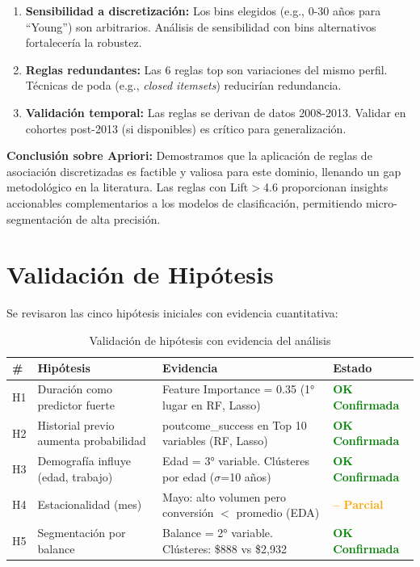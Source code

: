 \documentclass[12pt,letterpaper]{article}
\begin{document}
\begin{enumerate}
    \item \textbf{Sensibilidad a discretización:} Los bins elegidos (e.g., 0-30 años para ``Young'') son arbitrarios. Análisis de sensibilidad con bins alternativos fortalecería la robustez.
    
    \item \textbf{Reglas redundantes:} Las 6 reglas top son variaciones del mismo perfil. Técnicas de poda (e.g., \textit{closed itemsets}) reducirían redundancia.
    
    \item \textbf{Validación temporal:} Las reglas se derivan de datos 2008-2013. Validar en cohortes post-2013 (si disponibles) es crítico para generalización.
\end{enumerate}

\textbf{Conclusión sobre Apriori:} Demostramos que la aplicación de reglas de asociación discretizadas es factible y valiosa para este dominio, llenando un gap metodológico en la literatura. Las reglas con Lift$>$4.6 proporcionan insights accionables complementarios a los modelos de clasificación, permitiendo micro-segmentación de alta precisión.

\newpage
\section{Validación de Hipótesis}

Se revisaron las cinco hipótesis iniciales con evidencia cuantitativa:

\begin{table}[H]
\centering
\caption{Validación de hipótesis con evidencia del análisis}
\label{tab:validacion_hipotesis}
\small
\begin{tabular}{@{} p{0.8cm} p{4cm} p{7cm} p{3.5cm} @{}}
\toprule
\textbf{\#} & \textbf{Hipótesis} & \textbf{Evidencia} & \textbf{Estado} \\
\midrule
H1 & Duración como predictor fuerte & Feature Importance = 0.35 (1° lugar en RF, Lasso) & \textcolor{green}{\textbf{OK Confirmada}} \\
\midrule
H2 & Historial previo aumenta probabilidad & poutcome\_success en Top 10 variables (RF, Lasso) & \textcolor{green}{\textbf{OK Confirmada}} \\
\midrule
H3 & Demografía influye (edad, trabajo) & Edad = 3° variable. Clústeres por edad ($\sigma$=10 años) & \textcolor{green}{\textbf{OK Confirmada}} \\
\midrule
H4 & Estacionalidad (mes) & Mayo: alto volumen pero conversión $<$ promedio (EDA) & \textcolor{orange}{\textbf{-- Parcial}} \\
\midrule
H5 & Segmentación por balance & Balance = 2° variable. Clústeres: \$888 vs \$2,932 & \textcolor{green}{\textbf{OK Confirmada}} \\
\bottomrule
\end{tabular}
\end{table}
\end{document}
